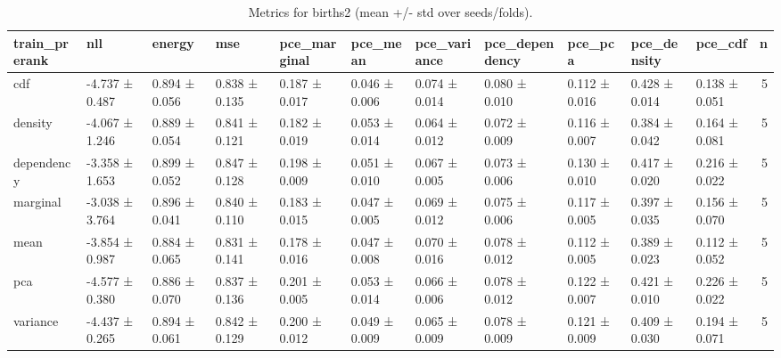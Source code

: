 \begin{table}
\caption{Metrics for births2 (mean +/- std over seeds/folds).}
\label{tab:metrics_summary_births2}
\begin{tabular}{lllllllllllr}
\toprule
train_prerank & nll & energy & mse & pce_marginal & pce_mean & pce_variance & pce_dependency & pce_pca & pce_density & pce_cdf & n \\
\midrule
cdf & -4.737 ± 0.487 & 0.894 ± 0.056 & 0.838 ± 0.135 & 0.187 ± 0.017 & 0.046 ± 0.006 & 0.074 ± 0.014 & 0.080 ± 0.010 & 0.112 ± 0.016 & 0.428 ± 0.014 & 0.138 ± 0.051 & 5 \\
density & -4.067 ± 1.246 & 0.889 ± 0.054 & 0.841 ± 0.121 & 0.182 ± 0.019 & 0.053 ± 0.014 & 0.064 ± 0.012 & 0.072 ± 0.009 & 0.116 ± 0.007 & 0.384 ± 0.042 & 0.164 ± 0.081 & 5 \\
dependency & -3.358 ± 1.653 & 0.899 ± 0.052 & 0.847 ± 0.128 & 0.198 ± 0.009 & 0.051 ± 0.010 & 0.067 ± 0.005 & 0.073 ± 0.006 & 0.130 ± 0.010 & 0.417 ± 0.020 & 0.216 ± 0.022 & 5 \\
marginal & -3.038 ± 3.764 & 0.896 ± 0.041 & 0.840 ± 0.110 & 0.183 ± 0.015 & 0.047 ± 0.005 & 0.069 ± 0.012 & 0.075 ± 0.006 & 0.117 ± 0.005 & 0.397 ± 0.035 & 0.156 ± 0.070 & 5 \\
mean & -3.854 ± 0.987 & 0.884 ± 0.065 & 0.831 ± 0.141 & 0.178 ± 0.016 & 0.047 ± 0.008 & 0.070 ± 0.016 & 0.078 ± 0.012 & 0.112 ± 0.005 & 0.389 ± 0.023 & 0.112 ± 0.052 & 5 \\
pca & -4.577 ± 0.380 & 0.886 ± 0.070 & 0.837 ± 0.136 & 0.201 ± 0.005 & 0.053 ± 0.014 & 0.066 ± 0.006 & 0.078 ± 0.012 & 0.122 ± 0.007 & 0.421 ± 0.010 & 0.226 ± 0.022 & 5 \\
variance & -4.437 ± 0.265 & 0.894 ± 0.061 & 0.842 ± 0.129 & 0.200 ± 0.012 & 0.049 ± 0.009 & 0.065 ± 0.009 & 0.078 ± 0.009 & 0.121 ± 0.009 & 0.409 ± 0.030 & 0.194 ± 0.071 & 5 \\
\bottomrule
\end{tabular}
\end{table}
